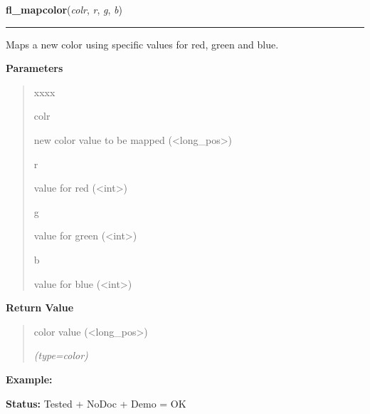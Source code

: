     \label{xformslib:library:fl_mapcolor}

    \vspace{0.5ex}

\hspace{.8\funcindent}\begin{boxedminipage}{\funcwidth}

    \raggedright \textbf{fl\_mapcolor}(\textit{colr}, \textit{r}, \textit{g}, \textit{b})

    \vspace{-1.5ex}

    \rule{\textwidth}{0.5\fboxrule}
\setlength{\parskip}{2ex}
    Maps a new color using specific values for red, green and blue.

\setlength{\parskip}{1ex}
      \textbf{Parameters}
      \vspace{-1ex}

      \begin{quote}
        \begin{Ventry}{xxxx}

          \item[colr]

          new color value to be mapped ({\textless}long\_pos{\textgreater})

          \item[r]

          value for red ({\textless}int{\textgreater})

          \item[g]

          value for green ({\textless}int{\textgreater})

          \item[b]

          value for blue ({\textless}int{\textgreater})

        \end{Ventry}

      \end{quote}

      \textbf{Return Value}
    \vspace{-1ex}

      \begin{quote}
      color value ({\textless}long\_pos{\textgreater})

      {\it (type=color)}

      \end{quote}

\textbf{Example:} 

\textbf{Status:} Tested + NoDoc + Demo = OK



    \end{boxedminipage}

